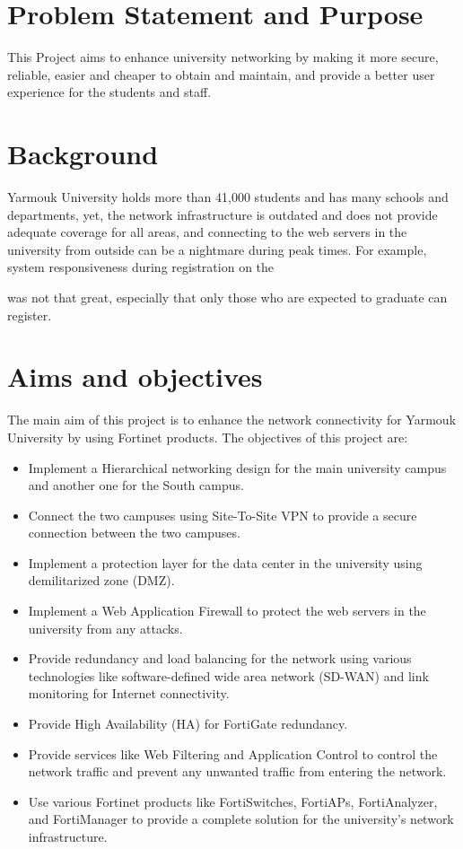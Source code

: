\documentclass[12pt]{report}
\begin{document}
\section{Problem Statement and Purpose}
This Project aims to enhance university networking by making it more secure, 
reliable, easier and cheaper to obtain and maintain, and provide a better user experience for the students and staff.

\section{Background}
Yarmouk University holds more than 41,000 students and has many schools and departments, yet, the network infrastructure is outdated and does not provide adequate coverage for all areas, and connecting to the web servers in the university from outside can be a nightmare during peak times. For example, system responsiveness during registration on the \date{19th of May, 2024} was not that great, especially that only those who are expected to graduate can register.
\section{Aims and objectives}
The main aim of this project is to enhance the network connectivity for Yarmouk University by using Fortinet products. The objectives of this project are:
\begin{itemize}
    \item Implement a Hierarchical networking design for the main university campus and another one for the South campus.
    \item Connect the two campuses using Site-To-Site VPN to provide a secure connection between the two campuses.
    \item Implement a protection layer for the data center in the university using demilitarized zone (DMZ).
    \item Implement a Web Application Firewall to protect the web servers in the university from any attacks.
    \item Provide redundancy and load balancing for the network using various technologies like software-defined wide area network (SD-WAN) and link monitoring for Internet connectivity.
    \item Provide High Availability (HA) for FortiGate redundancy.
    \item Provide services like Web Filtering and Application Control to control the network traffic and prevent any unwanted traffic from entering the network.
    \item Use various Fortinet products like FortiSwitches, FortiAPs, FortiAnalyzer, and FortiManager to provide a complete solution for the university's network infrastructure.
\end{itemize}
\end{document}

